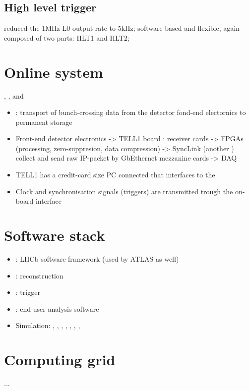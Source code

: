 \subsection{High level trigger}
reduced the 1MHz L0 output rate to 5kHz; software based and flexible, again composed of two parts: HLT1 and HLT2; 
\section{Online system}
\DAQ, \TFC, and \ECS
\begin{itemize}
  \item \DAQ: transport of bunch-crossing data from the detector fond-end electornics to permanent storage
  \item Front-end detector electronics -> TELL1 board : receiver cards -> \acp{FPGA} (processing, zero-suppresion, data compression) -> SyncLink (another \FPGA) collect and send raw IP-packet by GbEthernet mezzanine cards -> DAQ
  \item TELL1 has a credit-card size PC connected that interfaces to the \ECS
  \item Clock and synchronisation signals (\eg triggers) are transmitted trough the on-board \TTC interface
\end{itemize}

\section{Software stack}
\begin{itemize}
  \item \Gaudi: LHCb software framework (used by ATLAS as well)
  \item \Brunel: reconstruction
  \item \Brunel: trigger
  \item \DaVinci: end-user analysis software
  \item Simulation: \Gauss, \Boole, \Pythia, \EvtGen, \Photos, \Herwigpp, \Sherpa, \GeantFour
\end{itemize}
\section{Computing grid}
...
